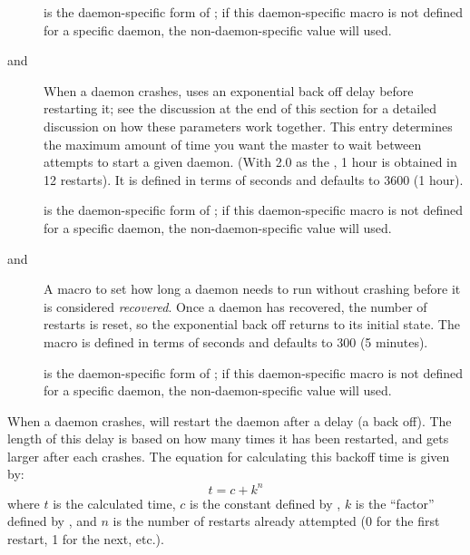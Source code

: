 \begin{description}
   is the daemon-specific
  form of ; if this daemon-specific
  macro is not defined for a specific daemon, the non-daemon-specific
  value will used.

\label{param:MasterBackoffCeiling}
\item[\Macro{MASTER\_BACKOFF\_CEILING} and
      \Macro{MASTER\_<name>\_BACKOFF\_CEILING}]
  When a daemon crashes,  uses an exponential back off
  delay before restarting it; see the discussion at the end of this
  section for a detailed discussion on how these parameters work together.
  This entry determines the maximum amount of time you want the master
  to wait between attempts to start a given daemon.
  (With 2.0 as the ,
  1 hour is obtained in 12 restarts).  It is defined in terms of
  seconds and defaults to 3600 (1 hour).

   is the daemon-specific
  form of ; if this daemon-specific
  macro is not defined for a specific daemon, the non-daemon-specific
  value will used.

\label{param:MasterRecoverFactor}
\item[\Macro{MASTER\_RECOVER\_FACTOR} and
      \Macro{MASTER\_<name>\_RECOVER\_FACTOR}]
  A macro to set how long a daemon 
  needs to run without crashing before it is considered \emph{recovered}.
  Once a
  daemon has recovered, the number of restarts is reset, so the
  exponential back off returns to its initial state.  
  The macro is defined in
  terms of seconds and defaults to 300 (5 minutes).

   is the daemon-specific
  form of ; if this daemon-specific
  macro is not defined for a specific daemon, the non-daemon-specific
  value will used.

\end{description}

When a daemon crashes,  will restart the daemon after a
delay (a back off).
The length of this delay is based on how many times it has been
restarted, and gets larger after each crashes. 
The equation for calculating this backoff time is
given by: $$t = c + k^n$$ where $t$ is the calculated time, $c$ is
the constant defined by , $k$ is
the ``factor'' defined by , and $n$
is the number of restarts already attempted (0 for the first restart,
1 for the next, etc.).

